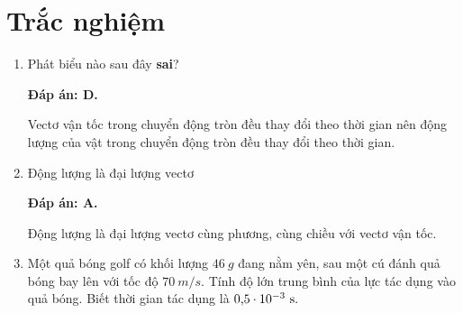 \section{Trắc nghiệm}
\begin{enumerate}[label=\bfseries Câu \arabic*:]
		\item {}
	
	
	{
		Phát biểu nào sau đây \textbf{sai}?
	}
	
	\hideall
	{	
		\textbf{Đáp án: D.}
		
		Vectơ vận tốc trong chuyển động tròn đều thay đổi theo thời gian nên động lượng của vật trong chuyển động tròn đều thay đổi theo thời gian.
	}
	\item {}
	
	
	{
		Động lượng là đại lượng vectơ
	}
	
	\hideall
	{	
		\textbf{Đáp án: A.}
		
		Động lượng là đại lượng vectơ cùng phương, cùng chiều với vectơ vận tốc.
	}

	\item {}
	
	
	{
		Một quả bóng golf có khối lượng $\SI{46}{g}$ đang nằm yên, sau một cú đánh quả bóng bay lên với tốc độ $\SI{70}{m/s}$. Tính độ lớn trung bình của lực tác dụng vào quả bóng. Biết thời gian tác dụng là $\text{0,5} \cdot 10^{-3}\ \text s.$
	}
	

\end{enumerate}
